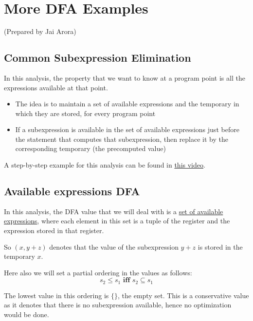 \setlength{\parindent}{0pt}
\clearpage

\section{More DFA Examples}
(Prepared by Jai Arora)
\vspace{0.3cm}

\subsection{Common Subexpression Elimination}


In this analysis, the property that we want to know at a program point is all the expressions available at that point.
\begin{itemize}
    \item The idea is to maintain a set of available expressions and the temporary in which they are stored, for every program point
    \item If a subexpression is available in the set of available expressions just before the statement that computes that subexpression, then replace it by the corresponding temporary (the precomputed value)
\end{itemize}

A step-by-step example for this analysis can be found in \href{https://www.youtube.com/watch?v=g3msUTH45Hg&list=PLf3ZkSCyj1tf3rPAkOKY5hUzDrDoekAc7&index=84}{this video}.\\

\subsection{Available expressions DFA}
In this analysis, the DFA value that we will deal with is a \underline{set of available expressions}, where each element in this set is a tuple of the register and the expression stored in that register.

So $(x, y+z)$ denotes that the value of the subexpression $y+z$ is stored in the temporary $x$.

\vspace{0.5cm}
Here also we will set a partial ordering in the values as follows:\\
$$s_2 \leqslant s_1 \textbf{ iff } s_2 \subseteq s_1$$

The lowest value in this ordering is $\{\}$, the empty set. This is a conservative value as it denotes that there is no subexpression available, hence no optimization would be done.

